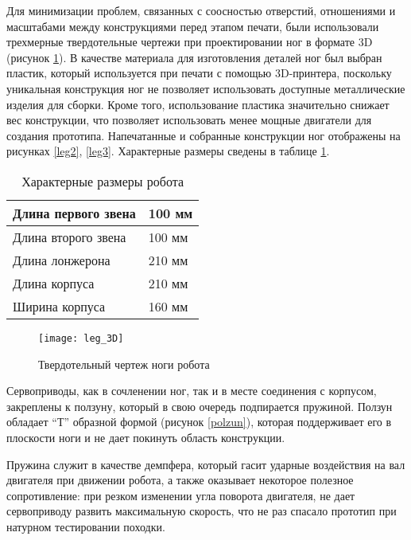 Для минимизации проблем, связанных с соосностью отверстий, отношениями и масштабами между конструкциями перед этапом печати, были использовали трехмерные твердотельные чертежи при проектировании ног в формате 3D (рисунок \ref{leg_3D}). В качестве материала для изготовления деталей ног был выбран пластик, который используется при печати с помощью 3D-принтера, поскольку уникальная конструкция ног не позволяет использовать доступные металлические изделия для сборки. Кроме того, использование пластика значительно снижает вес конструкции, что позволяет использовать менее мощные двигатели для создания прототипа. Напечатанные и собранные конструкции ног отображены на рисунках \ref{leg2}, \ref{leg3}. Характерные размеры сведены в таблице \ref{charac_table}.

\begin{table}[h]
	\begin{center}
		\caption{Характерные размеры робота}
		\label{charac_table}
		\begin{tabular}{| l | l |}
			\hline
			Длина первого звена & 100 мм\\ \hline
			Длина второго звена & 100 мм \\ \hline
			Длина лонжерона & 210 мм \\ \hline
			Длина корпуса & 210 мм \\ \hline
			Ширина корпуса & 160 мм \\ \hline
		\end{tabular}
	\end{center}
\end{table}

\newpage  
\begin{figure}[h!]
	\begin{center}
		\texttt{[image: leg\_3D]}
		\caption{Твердотельный чертеж ноги робота}
		\label{leg_3D}
	\end{center}
\end{figure}

Сервоприводы, как в сочленении ног, так и в месте соединения с корпусом, закреплены к ползуну, который в свою очередь подпирается пружиной. Ползун обладает ``Т'' образной формой (рисунок \ref{polzun}), которая поддерживает его в плоскости ноги и не дает покинуть область конструкции. 

Пружина служит в качестве демпфера, который гасит ударные воздействия на вал двигателя при движении робота, а также оказывает некоторое полезное сопротивление: при резком изменении угла поворота двигателя, не дает сервоприводу развить максимальную скорость, что не раз спасало прототип при натурном тестировании походки.

